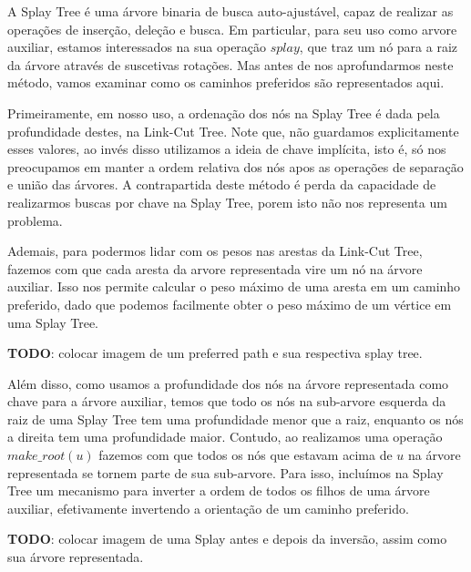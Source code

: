 A Splay Tree é uma árvore binaria de busca auto-ajustável, capaz de realizar as operações de inserção, deleção e busca. Em particular, para seu uso como arvore auxiliar, estamos interessados na sua operação $splay$, que traz um nó para a raiz da árvore através de suscetivas rotações. Mas antes de nos aprofundarmos neste método, vamos examinar como os caminhos preferidos são representados aqui.

Primeiramente, em nosso uso, a ordenação dos nós na Splay Tree é dada pela profundidade destes, na Link-Cut Tree. Note que, não guardamos explicitamente esses valores, ao invés disso utilizamos a ideia de chave implícita, isto é, só nos preocupamos em manter a ordem relativa dos nós apos as operações de separação e união das árvores. A contrapartida deste método é perda da capacidade de realizarmos buscas por chave na Splay Tree, porem isto não nos representa um problema.

Ademais, para podermos lidar com os pesos nas arestas da Link-Cut Tree, fazemos com que cada aresta da arvore representada vire um nó na árvore auxiliar. Isso nos permite calcular o peso máximo de uma aresta em um caminho preferido, dado que podemos facilmente obter o peso máximo de um vértice em uma Splay Tree.

\begin{center}
    \textbf{TODO}: colocar imagem de um preferred path e sua respectiva splay tree.
\end{center}

Além disso, como usamos a profundidade dos nós na árvore representada como chave para a árvore auxiliar, temos que todo os nós na sub-arvore esquerda da raiz de uma Splay Tree tem uma profundidade menor que a raiz, enquanto os nós a direita tem uma profundidade maior. Contudo, ao realizamos uma operação $make\_root(u)$ fazemos com que todos os nós que estavam acima de $u$ na árvore representada se tornem parte de sua sub-arvore. Para isso, incluímos na Splay Tree um mecanismo para inverter a ordem de todos os filhos de uma árvore auxiliar, efetivamente invertendo a orientação de um caminho preferido.

\begin{center}
    \textbf{TODO}: colocar imagem de uma Splay antes e depois da inversão, assim como sua árvore representada.
\end{center}

